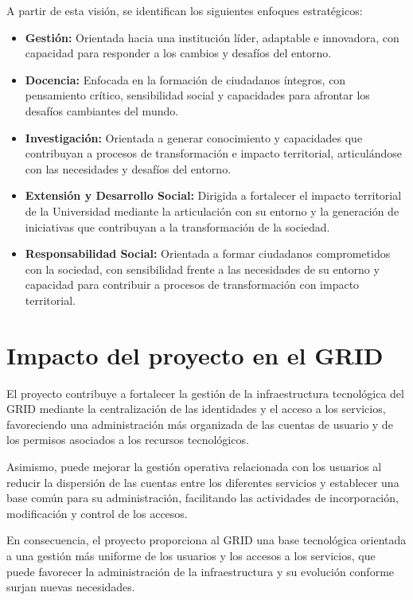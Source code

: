 A partir de esta visión, se identifican los siguientes enfoques estratégicos:

\begin{itemize}
	\item \textbf{Gestión:} Orientada hacia una institución líder, adaptable e innovadora, con capacidad para responder a los cambios y desafíos del entorno.

	\item \textbf{Docencia:} Enfocada en la formación de ciudadanos íntegros, con pensamiento crítico, sensibilidad social y capacidades para afrontar los desafíos cambiantes del mundo.

	\item \textbf{Investigación:} Orientada a generar conocimiento y capacidades que contribuyan a procesos de transformación e impacto territorial, articulándose con las necesidades y desafíos del entorno.

	\item \textbf{Extensión y Desarrollo Social:} Dirigida a fortalecer el impacto territorial de la Universidad mediante la articulación con su entorno y la generación de iniciativas que contribuyan a la transformación de la sociedad.

	\item \textbf{Responsabilidad Social:} Orientada a formar ciudadanos comprometidos con la sociedad, con sensibilidad frente a las necesidades de su entorno y capacidad para contribuir a procesos de transformación con impacto territorial.
\end{itemize}

\section{Impacto del proyecto en el \texorpdfstring{\ac{GRID}}{}}

El proyecto contribuye a fortalecer la gestión de la infraestructura tecnológica del \ac{GRID} mediante la centralización de las identidades y el acceso a los servicios, favoreciendo una administración más organizada de las cuentas de usuario y de los permisos asociados a los recursos tecnológicos.

Asimismo, puede mejorar la gestión operativa relacionada con los usuarios al reducir la dispersión de las cuentas entre los diferentes servicios y establecer una base común para su administración, facilitando las actividades de incorporación, modificación y control de los accesos.

En consecuencia, el proyecto proporciona al \ac{GRID} una base tecnológica orientada a una gestión más uniforme de los usuarios y los accesos a los servicios, que puede favorecer la administración de la infraestructura y su evolución conforme surjan nuevas necesidades.

